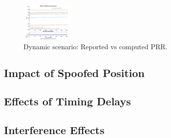             \begin{figure}[h!]
            \centering
            \includegraphics[width=0.23\textwidth]{images/Tram_15_trip_Castello_to_Pescatore/filtered/Samsung_A51_Tram_15_trip_Castello_to_Pescatore_fig2.png}
            \caption{Dynamic scenario: Reported vs computed PRR.}
            \label{fig:dynamic_prr}
            \end{figure}
            
    \subsection{Impact of Spoofed Position}
        


    \subsection{Effects of Timing Delays}
    


    \subsection{Interference Effects}
    

